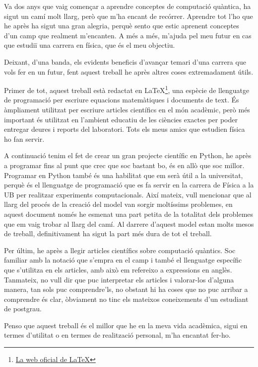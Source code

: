 \documentclass[a4paper,12pt,arial,numbered,print,index,oneside]{book}
\begin{document}
	Va dos anys que vaig començar a aprendre conceptes de computació quàntica, ha sigut un camí molt llarg, però que m'ha encant de recórrer. Aprendre tot l'ho que he après ha sigut una gran alegria, perquè sento que estic aprenent conceptes d'un camp que realment m'encanten. A més a més, m'ajuda pel meu futur en cas que estudiï una carrera en física, que és el meu objectiu.

	Deixant, d'una banda, els evidents beneficis d'avançar temari d'una carrera que vols fer en un futur, fent aquest treball he après altres coses extremadament útils.

	Primer de tot, aquest treball està redactat en \LaTeX\footnote{\href{https://www.latex-project.org/}{La web oficial de \LaTeX}}, una espècie de llenguatge de programació per escriure equacions matemàtiques i documents de text. És àmpliament utilitzat per escriure articles científics en el món acadèmic, però més important és utilitzat en l'ambient educatiu de les ciències exactes per poder entregar deures i reports del laboratori. Tots els meus amics que estudien física ho fan servir.

	A continuació tenim el fet de crear un gran projecte científic en Python, he après a programar fins al punt que crec que soc bastant bo, és en allò que soc millor. Programar en Python també és una habilitat que em serà útil a la universitat, perquè és el llenguatge de programació que es fa servir en la carrera de Física a la UB per realitzar experiments computacionals. Així mateix, vull mencionar que al llarg del procés de la creació del model van sorgir moltíssims problemes, en aquest document només he esmenat una part petita de la totalitat dels problemes que em vaig trobar al llarg del camí. Al darrere d'aquest model estan molts mesos de treball, definitivament ha sigut la part més dura de tot el treball.

	Per últim, he après a llegir articles científics sobre computació quàntics. Soc familiar amb la notació que s'empra en el camp i també el llenguatge específic que s'utilitza en els articles, amb això em refereixo a expressions en anglès. Tanmateix, no vull dir que puc interpretar els articles i valorar-los d'alguna manera, tan sols puc comprendre'ls, no obstant hi ha coses que no puc arribar a comprendre és clar, òbviament no tinc els mateixos coneixements d'un estudiant de postgrau.
	
	
	Penso que aquest treball és el millor que he en la meva vida acadèmica, sigui en termes d'utilitat o en termes de realització personal, m'ha encantat fer-ho.
	
\end{document}
